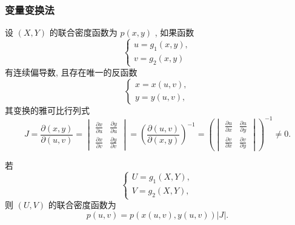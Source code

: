     \subsubsection{变量变换法}
    设 $(X,Y)$ 的联合密度函数为 $p(x,y)$ , 如果函数
    \begin{equation*}
    	\begin{cases}
    	u=g_{1}(x,y),\\
    	v=g_{2}(x,y)
    	\end{cases}
    \end{equation*}
    有连续偏导数, 且存在唯一的反函数
    \begin{equation*}
    	\begin{cases}
    	x=x(u,v),\\
    	y=y(u,v),
    	\end{cases}
    \end{equation*}
    其变换的雅可比行列式
    \begin{equation}\label{eq:3.3.19}
    	J=\frac{\partial(x,y)}{\partial(u,v)}=
    	\begin{vmatrix}
    	\frac{\partial x}{\partial u} & \frac{\partial y}{\partial u}\\
    	\frac{\partial x}{\partial v} & \frac{\partial y}{\partial v}
    	\end{vmatrix}=
    	\left( \frac{\partial(u,v)}{\partial(x,y)}
    	\right) ^{-1}=
    	\left(
    	\begin{vmatrix}
    	\frac{\partial u}{\partial x} & \frac{\partial u}{\partial y}\\
    	\frac{\partial v}{\partial x} & \frac{\partial v}{\partial y}
    	\end{vmatrix}
    	\right) ^{-1}\ne0.
    \end{equation}

    若
    \begin{equation*}
    	\begin{cases}
    	U=g_{1}(X,Y),\\
    	V=g_{2}(X,Y),
    	\end{cases}
    \end{equation*}
    则 $(U,V)$ 的联合密度函数为
    \begin{equation}\label{eq:3.3.20}
    	p(u,v)=p(x(u,v),y(u,v))|J|.
    \end{equation}

